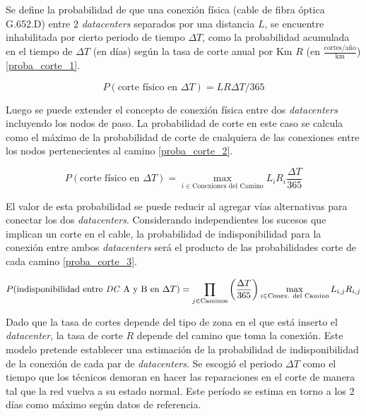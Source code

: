 Se define la probabilidad de que una conexión física (cable de fibra 
óptica G.652.D) entre 2 \emph{datacenters} separados por una distancia 
$L$, se encuentre inhabilitada por cierto periodo de tiempo $\Delta T$, 
como la probabilidad acumulada en el tiempo de $\Delta T$ (en días) 
según la tasa de corte anual por Km $R$ (en $\frac{\text{cortes}/\text{año}}{\text{km}}$) \eqref{proba_corte_1}.

\begin{equation}
\label{proba_corte_1}
P(\text{corte físico en }\Delta T) = L R \Delta T /365
\end{equation}

Luego se puede extender el concepto de conexión física entre dos 
\emph{datacenters} incluyendo los nodos de paso. La probabilidad de 
corte en este caso se calcula como el máximo de la probabilidad de 
corte de cualquiera de las conexiones entre los nodos pertenecientes al 
camino \eqref{proba_corte_2}.

\begin{equation}
\label{proba_corte_2}
P(\text{corte físico en }\Delta T) = \max_{i \in \text{Conexiones del Camino}} {L_i R_i \frac{\Delta T}{ 365}}
\end{equation}

El valor de esta probabilidad se puede reducir al agregar vías 
alternativas para conectar los dos \emph{datacenters}. Considerando 
independientes los sucesos que implican un corte en el cable, la 
probabilidad de indisponibilidad para la conexión entre ambos 
\emph{datacenters} será el producto de las probabilidades corte de cada 
camino \eqref{proba_corte_3}.

\begin{equation}
\label{proba_corte_3}
P(\text{indisponibilidad entre \emph{DC} A y B en }\Delta T) =  \prod_{j \in \text{Caminos}}\left( \frac{\Delta T}{365}\right) \max_{i \in \text{Conex. del Camino}} {L_{i,j} R_{i,j} }
\end{equation}

Dado que la tasa de cortes depende del tipo de zona en el que está 
inserto el \emph{datacenter}, la tasa de corte $R$ depende del camino 
que toma la conexión. Este modelo pretende establecer una estimación de 
la probabilidad de indisponibilidad de la conexión de cada par de 
\emph{datacenters}. Se escogió el periodo $\Delta T$ como el tiempo que 
los técnicos demoran en hacer las reparaciones en el corte de manera tal 
que la red vuelva a su estado normal. Este período se estima en torno a 
los 2 días como máximo según datos de referencia.

